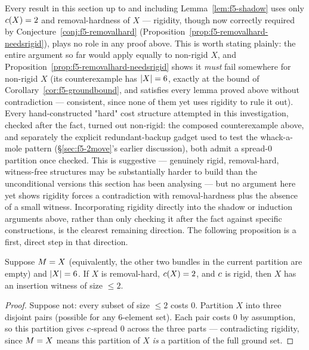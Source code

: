 \begin{remark}
\label{rem:f5-rigidity-unused}
Every result in this section up to and including Lemma~\ref{lem:f5-shadow}
uses only $c(X)=2$ and removal-hardness of $X$ --- rigidity, though now
correctly required by Conjecture~\ref{conj:f5-removalhard}
(Proposition~\ref{prop:f5-removalhard-needsrigid}), plays no role in any proof
above. This is worth stating plainly: the entire argument so far would apply
equally to non-rigid $X$, and Proposition~\ref{prop:f5-removalhard-needsrigid}
shows it \emph{must} fail somewhere for non-rigid $X$ (its counterexample has
$\abs X = 6$, exactly at the bound of Corollary~\ref{cor:f5-groundbound}, and
satisfies every lemma proved above without contradiction --- consistent, since
none of them yet uses rigidity to rule it out). Every hand-constructed "hard"
cost structure attempted in this investigation, checked after the fact,
turned out non-rigid: the composed counterexample above, and separately the
explicit redundant-backup gadget used to test the whack-a-mole pattern
(\S\ref{sec:f5-2move}'s earlier discussion), both admit a spread-$0$
partition once checked. This is suggestive --- genuinely rigid, removal-hard,
witness-free structures may be substantially harder to build than the
unconditional versions this section has been analysing --- but no argument
here yet shows rigidity forces a contradiction with removal-hardness plus the
absence of a small witness. Incorporating rigidity directly into the shadow
or induction arguments above, rather than only checking it after the fact
against specific constructions, is the clearest remaining direction. The
following proposition is a first, direct step in that direction.
\end{remark}

\begin{proposition}[$\abs X = 6$ resolved, when $\items = X$]
\label{prop:f5-six-resolved}
Suppose $\items = X$ (equivalently, the other two bundles in the current
partition are empty) and $\abs X = 6$. If $X$ is removal-hard, $c(X)=2$,
and $c$ is rigid, then $X$ has an insertion witness of size $\le 2$.
\end{proposition}

\begin{proof}
Suppose not: every subset of size $\le 2$ costs $0$. Partition $X$ into three
disjoint pairs (possible for any $6$-element set). Each pair costs $0$ by
assumption, so this partition gives $c$-spread $0$ across the three parts
--- contradicting rigidity, since $\items = X$ means this partition of $X$
\emph{is} a partition of the full ground set.
\end{proof}

